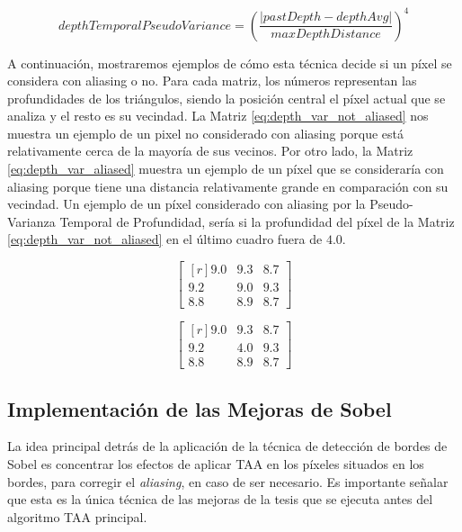 \documentclass[pregrado]{tesis-usb} %
\begin{document}
\begin{equation} \label{eq:depthtemporalpseudovariance}
depthTemporalPseudoVariance = \left( \frac{\left|pastDepth-depthAvg\right|}{maxDepthDistance}\right)^4
\end{equation}

A continuación, mostraremos ejemplos de cómo esta técnica decide si un píxel se considera con aliasing o no. Para cada matriz, los números representan las profundidades de los triángulos, siendo la posición central el píxel actual que se analiza y el resto es su vecindad. La Matriz \ref{eq:depth_var_not_aliased} nos muestra un ejemplo de un pixel no considerado con aliasing porque está relativamente cerca de la mayoría de sus vecinos. Por otro lado, la Matriz \ref{eq:depth_var_aliased} muestra un ejemplo de un píxel que se consideraría con aliasing porque tiene una distancia relativamente grande en comparación con su vecindad. Un ejemplo de un píxel considerado con aliasing por la Pseudo-Varianza Temporal de Profundidad, sería si la profundidad del píxel de la Matriz \ref{eq:depth_var_not_aliased} en el último cuadro fuera de $4.0$.

\begin{equation}\label{eq:depth_var_not_aliased}
\begin{bmatrix*}[r]
9.0 &  9.3 & 8.7 \\
9.2 &  9.0 & 9.3 \\
8.8 &  8.9 & 8.7
\end{bmatrix*}
\end{equation}

\begin{equation}\label{eq:depth_var_aliased}
\begin{bmatrix*}[r]
9.0 &  9.3 & 8.7 \\
9.2 &  4.0 & 9.3 \\
8.8 &  8.9 & 8.7
\end{bmatrix*}
\end{equation}

\subsection{Implementación de las Mejoras de Sobel}
La idea principal detrás de la aplicación de la técnica de detección de bordes de Sobel es concentrar los efectos de aplicar TAA en los píxeles situados en los bordes, para corregir el \textit{aliasing}, en caso de ser necesario. Es importante señalar que esta es la única técnica de las mejoras de la tesis que se ejecuta antes del algoritmo TAA principal.
\end{document}
